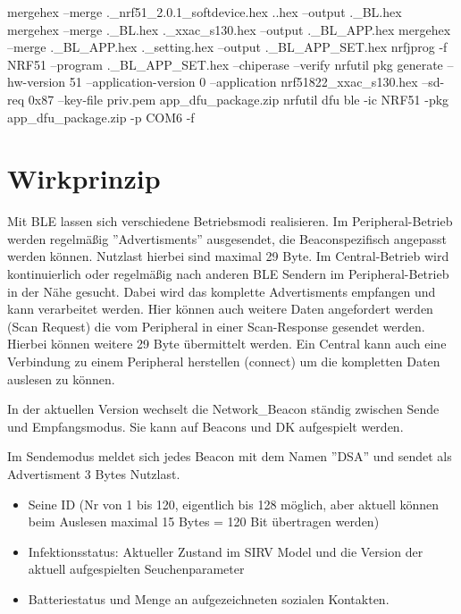 \documentclass[11pt,ngerman]{scrartcl} %
\begin{document}
mergehex --merge ._nrf51_2.0.1_softdevice.hex .\bootloader.hex --output .\SD_BL.hex
mergehex --merge .\SD_BL.hex ._xxac_s130.hex --output .\SD_BL_APP.hex
mergehex --merge .\SD_BL_APP.hex .\bootloader_setting.hex --output .\SD_BL_APP_SET.hex
nrfjprog  -f NRF51 --program .\SD_BL_APP_SET.hex  --chiperase  --verify
nrfutil pkg generate --hw-version 51 --application-version 0 --application nrf51822_xxac_s130.hex --sd-req 0x87 --key-file priv.pem app_dfu_package.zip
nrfutil dfu ble -ic NRF51 -pkg app_dfu_package.zip -p COM6 -f

\section{Wirkprinzip}
Mit BLE lassen sich verschiedene Betriebsmodi realisieren. Im Peripheral-Betrieb werden regelmäßig ''Advertisments'' ausgesendet, die Beaconspezifisch angepasst werden können. Nutzlast hierbei sind maximal 29 Byte. Im Central-Betrieb wird kontinuierlich oder regelmäßig nach anderen BLE Sendern im Peripheral-Betrieb in der Nähe gesucht. Dabei wird das komplette Advertisments empfangen und kann verarbeitet werden. Hier können auch weitere Daten angefordert werden (Scan Request) die vom Peripheral in einer Scan-Response gesendet werden. Hierbei können weitere 29 Byte übermittelt werden. Ein Central kann auch eine Verbindung zu einem Peripheral herstellen  (connect) um die kompletten Daten auslesen zu können.

In der aktuellen Version wechselt die Network\_Beacon ständig zwischen Sende und Empfangsmodus. Sie kann auf Beacons und DK aufgespielt werden.

Im Sendemodus  meldet sich jedes Beacon mit dem Namen ''DSA'' und sendet als Advertisment 3 Bytes Nutzlast. 
\begin{itemize}
\item Seine ID (Nr von 1 bis 120, eigentlich bis 128 möglich, aber aktuell können beim Auslesen maximal 15 Bytes = 120 Bit übertragen werden)
\item Infektionsstatus: Aktueller Zustand im SIRV Model und die Version der aktuell aufgespielten Seuchenparameter
\item Batteriestatus und Menge an aufgezeichneten sozialen Kontakten.
\end{itemize}
\end{document}
